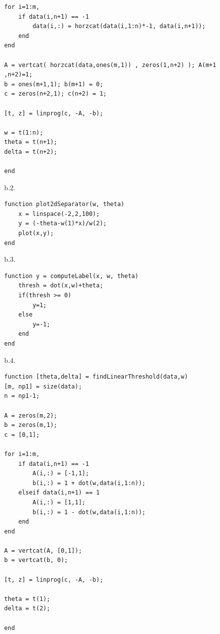 \begin{enumerate}
\begin{enumerate}
\begin{verbatim}
for i=1:m,
    if data(i,n+1) == -1
        data(i,:) = horzcat(data(i,1:n)*-1, data(i,n+1));
    end
end

A = vertcat( horzcat(data,ones(m,1)) , zeros(1,n+2) ); A(m+1 ,n+2)=1;
b = ones(m+1,1); b(m+1) = 0;
c = zeros(n+2,1); c(n+2) = 1;

[t, z] = linprog(c, -A, -b);

w = t(1:n);
theta = t(n+1);
delta = t(n+2);

end
      \end{verbatim}
      \item [b.2.]
      \begin{verbatim}
function plot2dSeparator(w, theta)
    x = linspace(-2,2,100);
    y = (-theta-w(1)*x)/w(2);
    plot(x,y);
end
      \end{verbatim}  
      \item [b.3.]
      \begin{verbatim}
function y = computeLabel(x, w, theta)
    thresh = dot(x,w)+theta;
    if(thresh >= 0)
        y=1;
    else
        y=-1;
    end
end
      \end{verbatim}
      \item [b.4.]
      \begin{verbatim}
function [theta,delta] = findLinearThreshold(data,w)
[m, np1] = size(data);
n = np1-1;

A = zeros(m,2);
b = zeros(m,1);
c = [0,1];

for i=1:m,
    if data(i,n+1) == -1
        A(i,:) = [-1,1];
        b(i,:) = 1 + dot(w,data(i,1:n));
    elseif data(i,n+1) == 1
        A(i,:) = [1,1];
        b(i,:) = 1 - dot(w,data(i,1:n));
    end         
end

A = vertcat(A, [0,1]);
b = vertcat(b, 0);

[t, z] = linprog(c, -A, -b);

theta = t(1);
delta = t(2);

end
      \end{verbatim} 
      \end{enumerate}
\end{enumerate}




